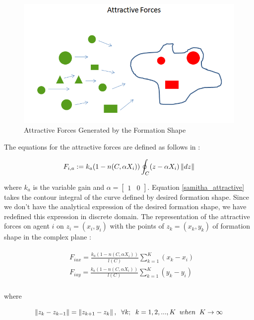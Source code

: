 \begin{figure}[H]
\caption{Attractive Forces Generated by the Formation Shape}
\centering
\includegraphics[scale = 0.60]{attractive_forces}
\end{figure}	

The equations for the attractive forces are defined as follows in \cite{17}:			

\begin{equation} \label{samitha_attractive}
F_{i,a} := k_a (1-n(C,\alpha X_i)) \oint_C(z-\alpha X_i)\left\lVert dz\right\rVert
\end{equation}

where $k_a$ is the variable gain and $\alpha = \begin{bmatrix}
1 & 0
		\end{bmatrix}$. Equation \ref{samitha_attractive} takes the contour integral of the curve defined by desired formation shape. Since we don't have the analytical expression of the desired formation shape, we have redefined this expression in discrete domain. The representation of the attractive forces on agent $i$ on $z_i = (x_i, y_i)$ with the points of  $z_k = (x_k,y_k)$ of formation shape in the complex plane \cite{17}:

\begin{align}
\begin{split}
& F_{iax} =\frac{k_a (1-n(C,\alpha X_i))}{l(C)}  \sum_{k=1}^{K} (x_k  - x_i)\\
& F_{iay} =\frac{k_a (1-n(C,\alpha X_i))}{l(C)}  \sum_{k=1}^{K} (y_k  - y_i)\\
\end{split}
\end{align}
			
where

\begin{equation}
\left\lVert z_k - z_{k-1}\right\rVert = \left\lVert z_{k+1} - z_k\right\rVert, \hspace{0.2cm}  \forall k ;  \hspace{0.2cm} k=1,2,...,K \hspace{0.2cm} when  \hspace{0.2cm} K \to\infty
\end{equation}
			
